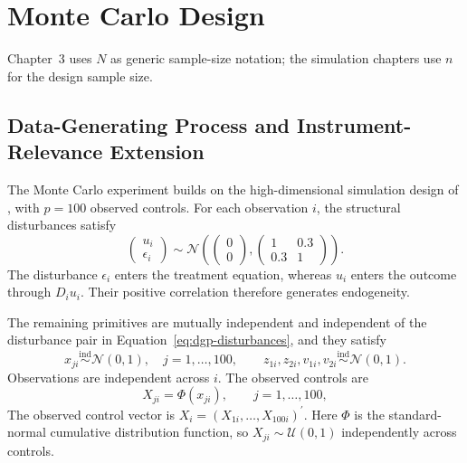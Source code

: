 \section{Monte Carlo Design}

Chapter~3 uses $N$ as generic sample-size notation; the simulation chapters use $n$ for the design sample size.

\subsection{Data-Generating Process and Instrument-Relevance Extension}

The Monte Carlo experiment builds on the high-dimensional simulation design of \textcite{chen_huang_tien_2021}, with $p=100$ observed controls. For each observation $i$, the structural disturbances satisfy
\begin{equation}
  \begin{pmatrix}
    u_i \\
    \epsilon_i
  \end{pmatrix}
  \sim
  \mathcal{N}\!\left(
    \begin{pmatrix} 0 \\ 0 \end{pmatrix},
    \begin{pmatrix} 1 & 0.3 \\ 0.3 & 1 \end{pmatrix}
  \right).
  \label{eq:dgp-disturbances}
\end{equation}
The disturbance $\epsilon_i$ enters the treatment equation, whereas $u_i$ enters the outcome through $D_i u_i$. Their positive correlation therefore generates endogeneity.

The remaining primitives are mutually independent and independent of the disturbance pair in Equation~\eqref{eq:dgp-disturbances}, and they satisfy
\begin{equation}
  x_{ji}\overset{\mathrm{ind}}{\sim}\mathcal{N}(0,1),
  \quad j=1,\ldots,100,
  \qquad
  z_{1i},z_{2i},v_{1i},v_{2i}
  \overset{\mathrm{ind}}{\sim}\mathcal{N}(0,1).
  \label{eq:dgp-primitives}
\end{equation}
Observations are independent across $i$. The observed controls are
\begin{equation}
  X_{ji}=\Phi(x_{ji}),
  \qquad j=1,\ldots,100,
  \label{eq:dgp-controls}
\end{equation}
The observed control vector is $X_i=(X_{1i},\ldots,X_{100i})^{\prime}$. Here $\Phi$ is the standard-normal cumulative distribution function, so $X_{ji}\sim\mathcal{U}(0,1)$ independently across controls.

